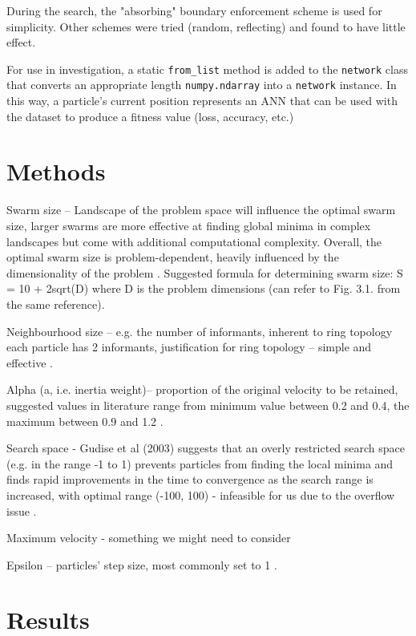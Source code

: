 \documentclass[12pt]{article}
\begin{document}
During the search, the "absorbing" \cite{Chu} boundary enforcement scheme is used
for simplicity. Other schemes were tried (random, reflecting) and found to have
little effect.

For use in investigation, a static \texttt{from\_list} method is added to
the \texttt{network} class that converts an appropriate length \texttt{numpy.ndarray}
into a \texttt{network} instance. In this way, a particle's current position
represents an ANN that can be used with the dataset to produce a fitness value (loss, accuracy, etc.)

\vspace{-1.5em}
\section{Methods}


Swarm size – Landscape of the problem space will influence the optimal swarm size, larger swarms are more effective at finding global minima in complex landscapes but come with additional computational complexity. Overall, the optimal swarm size is problem-dependent, heavily influenced by the dimensionality of the problem \cite{Razee}. Suggested formula for determining swarm size: S = 10 + 2sqrt(D) where D is the problem dimensions (can refer to Fig. 3.1. from the same reference)\cite{Clerc}.

Neighbourhood size – e.g. the number of informants, inherent to ring topology each particle has 2 informants, justification for ring topology – simple and effective \cite{Clerc}.

Alpha (a, i.e. inertia weight)– proportion of the original velocity to be retained, suggested values in literature range from minimum value between 0.2 and 0.4, the maximum between 0.9 and 1.2 \cite{Razee} \cite{Gudise}.

Search space - Gudise et al (2003) suggests that an overly restricted search space (e.g. in the range -1 to 1) prevents particles from finding the local minima and finds rapid improvements in the time to convergence as the search range is increased, with  optimal range (-100, 100) - infeasible for us due to the overflow issue \cite{Gudise}.

Maximum velocity - something we might need to consider

Epsilon – particles' step size, most commonly set to 1 \cite{Luke}.


\vspace{-1.5em}
\section{Results}
\end{document}

